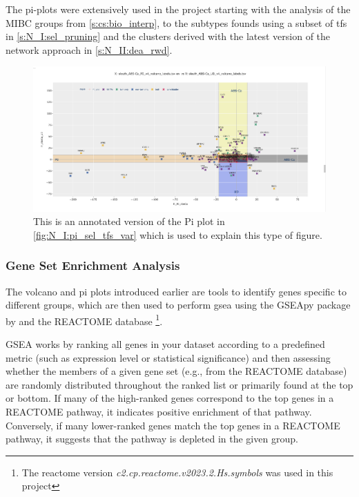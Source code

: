 The pi-plots were extensively used in the project starting with the analysis of the MIBC groups from \cref{s:cs:bio_interp}, to the subtypes founds using a subset of \acrlong{tf}s in \cref{s:N_I:sel_pruning} and the clusters derived with the latest version of the network approach in \cref{s:N_II:dea_rwd}.

\begin{figure}[!htb]    
    \centering
    \includegraphics[width=1.0\textwidth,height=1.0\textheight,keepaspectratio]{Sections/Network_I/Resources/selective_pruning/sel_tfs/sel_tfs_pi_all_var_rect.png}
    \caption{This is an annotated version of the Pi plot in \cref{fig:N_I:pi_sel_tfs_var} which is used to explain this type of figure.}
    \label{fig:lit:pi_eg}
\end{figure}

\subsubsection{Gene Set Enrichment Analysis} \label{s:lit:gsea}

The volcano and pi plots introduced earlier are tools to identify genes specific to different groups, which are then used to perform \acrfull{gsea} using the GSEApy package by \citep{Fang2023-ec} and the REACTOME database \cite{Milacic2024-yt} \footnote{The reactome version \textit{c2.cp.reactome.v2023.2.Hs.symbols }was used in this project}.

GSEA works by ranking all genes in your dataset according to a predefined metric (such as expression level or statistical significance) and then assessing whether the members of a given gene set (e.g., from the REACTOME database) are randomly distributed throughout the ranked list or primarily found at the top or bottom. If many of the high-ranked genes correspond to the top genes in a REACTOME pathway, it indicates positive enrichment of that pathway. Conversely, if many lower-ranked genes match the top genes in a REACTOME pathway, it suggests that the pathway is depleted in the given group.

